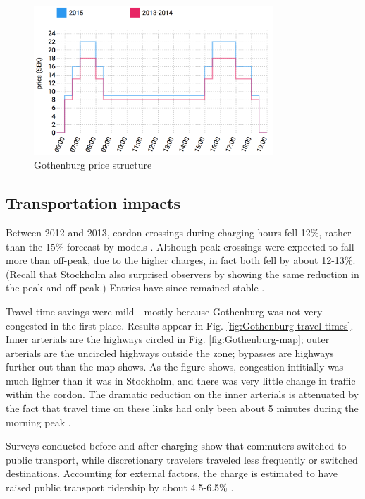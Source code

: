 \begin{figure}
    \includegraphics[width=0.8\textwidth]{../img/gothenburg-prices.png}
    \caption{Gothenburg price structure } 
    \label{fig:gothenburg-prices}
\end{figure}

\subsection{Transportation impacts}

Between 2012 and 2013, cordon crossings during charging hours fell 12\%, rather than the 15\% forecast by models \citep{Borjesson2015}. Although peak crossings were expected to fall more than off-peak, due to the higher charges, in fact both fell by about 12-13\%. (Recall that Stockholm also surprised observers by showing the same reduction in the peak and off-peak.) Entries have since remained stable \citet[Tab. 5]{Borjesson2018}.

Travel time savings were mild---mostly because Gothenburg was not very congested in the first place. Results appear in Fig. \ref{fig:Gothenburg-travel-times}. Inner arterials are the highways circled in Fig. \ref{fig:Gothenburg-map}; outer arterials are the uncircled highways outside the zone; bypasses are highways further out than the map shows. As the figure shows, congestion intitially was much lighter than it was in Stockholm, and there was very little change in traffic within the cordon. The dramatic reduction on the inner arterials is attenuated by the fact that travel time on these links had only been about 5 minutes during the morning peak \citep{Borjesson2015}.

Surveys conducted before and after charging show that commuters switched to public transport, while discretionary travelers traveled less frequently or switched destinations. Accounting for external factors, the charge is estimated to have raised public transport ridership by about 4.5-6.5\% \citep{Borjesson2015}.

